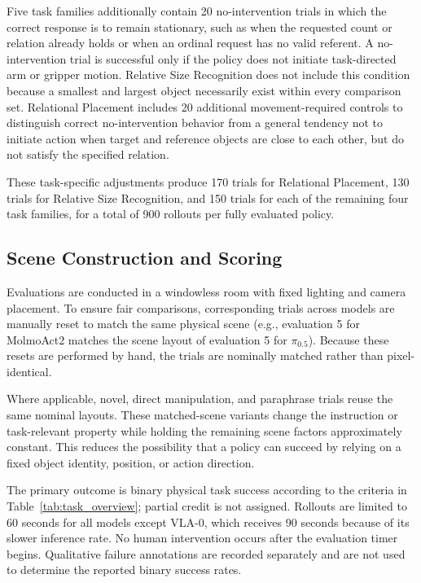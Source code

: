 \documentclass[conference]{IEEEtran}
\begin{document}
Five task families additionally contain 20 no-intervention trials in which the correct response is to remain stationary, such as when the requested count or relation already holds or when an ordinal request has no valid referent. A no-intervention trial is successful only if the policy does not initiate task-directed arm or gripper motion. Relative Size Recognition does not include this condition because a smallest and largest object necessarily exist within every comparison set. Relational Placement includes 20 additional movement-required controls to distinguish correct no-intervention behavior from a general tendency not to initiate action when target and reference objects are close to each other, but do not satisfy the specified relation.

These task-specific adjustments produce 170 trials for Relational Placement, 130 trials for Relative Size Recognition, and 150 trials for each of the remaining four task families, for a total of 900 rollouts per fully evaluated policy.


\subsection{Scene Construction and Scoring}

Evaluations are conducted in a windowless room with fixed lighting and camera placement. To ensure fair comparisons, corresponding trials across models are manually reset to match the same physical scene (e.g., evaluation 5 for MolmoAct2 matches the scene layout of evaluation 5 for $\pi_{0.5}$). Because these resets are performed by hand, the trials are nominally matched rather than pixel-identical.

Where applicable, novel, direct manipulation, and paraphrase trials reuse the same nominal layouts. These matched-scene variants change the instruction or task-relevant property while holding the remaining scene factors approximately constant. This reduces the possibility that a policy can succeed by relying on a fixed object identity, position, or action direction.

The primary outcome is binary physical task success according to the criteria in Table~\ref{tab:task_overview}; partial credit is not assigned. Rollouts are limited to 60 seconds for all models except VLA-0, which receives 90 seconds because of its slower inference rate. No human intervention occurs after the evaluation timer begins. Qualitative failure annotations are recorded separately and are not used to determine the reported binary success rates.
\end{document}
